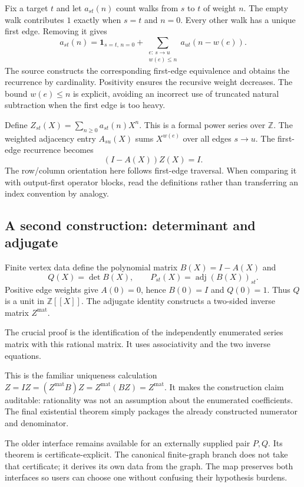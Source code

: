Fix a target $t$ and let $a_{st}(n)$ count walks from $s$ to $t$ of weight $n$. The empty walk contributes $1$ exactly when $s=t$ and $n=0$. Every other walk has a unique first edge. Removing it gives
\[
a_{st}(n)=\mathbf 1_{s=t,\,n=0}
+\sum_{\substack{e:\,s\to u\\w(e)\le n}}a_{ut}(n-w(e)).
\]
The source constructs the corresponding first-edge equivalence and obtains the recurrence by cardinality. Positivity ensures the recursive weight decreases. The bound $w(e)\le n$ is explicit, avoiding an incorrect use of truncated natural subtraction when the first edge is too heavy.

Define $Z_{st}(X)=\sum_{n\ge0}a_{st}(n)X^n$. This is a formal power series over $\mathbb Z$. The weighted adjacency entry $A_{su}(X)$ sums $X^{w(e)}$ over all edges $s\to u$. The first-edge recurrence becomes
\[
(I-A(X))Z(X)=I.
\]
The row/column orientation here follows first-edge traversal. When comparing it with output-first operator blocks, read the definitions rather than transferring an index convention by analogy.

\subsection{A second construction: determinant and adjugate}

Finite vertex data define the polynomial matrix $B(X)=I-A(X)$ and
\[
Q(X)=\det B(X),\qquad P_{st}(X)=\operatorname{adj}(B(X))_{st}.
\]
Positive edge weights give $A(0)=0$, hence $B(0)=I$ and $Q(0)=1$. Thus $Q$ is a unit in $\mathbb Z[\![X]\!]$. The adjugate identity constructs a two-sided inverse matrix $Z^{\mathrm{mat}}$.

The crucial proof is the identification of the independently enumerated series matrix with this rational matrix. It uses associativity and the two inverse equations.

This is the familiar uniqueness calculation $Z=I Z=(Z^{\mathrm{mat}}B)Z=Z^{\mathrm{mat}}(BZ)=Z^{\mathrm{mat}}$. It makes the construction claim auditable: rationality was not an assumption about the enumerated coefficients. The final existential theorem simply packages the already constructed numerator and denominator.

The older  interface remains available for an externally supplied pair $P,Q$. Its theorem is certificate-explicit. The canonical finite-graph branch does not take that certificate; it derives its own data from the graph. The map preserves both interfaces so users can choose one without confusing their hypothesis burdens.

